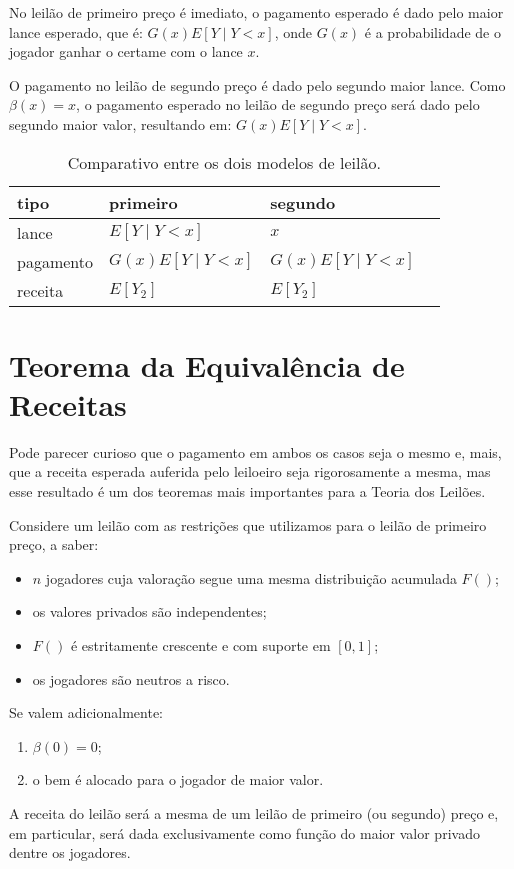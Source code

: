No leilão de primeiro preço é imediato, o pagamento esperado é dado pelo maior lance esperado, que é: $G(x)E\left[ Y \mid Y<x \right]$, onde $G(x)$ é a probabilidade de o jogador ganhar o certame com o lance $x$.

O pagamento no leilão de segundo preço é dado pelo segundo maior lance. Como $\beta(x) = x$, o pagamento esperado no leilão de segundo preço será dado pelo segundo maior valor, resultando em: $G(x)E\left[ Y \mid Y<x \right]$.

\begin{table}[]
	\centering
	\begin{tabular}{@{}llll@{}}
		\toprule
		tipo      & primeiro 					     & segundo      					\\ \midrule
		lance     & $E\left[ Y \mid Y<x \right]$     & $x$             					\\
		pagamento & $G(x)E\left[ Y \mid Y<x \right]$ & $G(x)E\left[ Y \mid Y<x \right]$ \\
		receita   & $E\left[ Y_2 \right]$            & $E\left[ Y_2 \right]$            \\
	\end{tabular}
	\caption{Comparativo entre os dois modelos de leilão.}
	\label{tab:tabela1}
\end{table}

\section{Teorema da Equivalência de Receitas}

Pode parecer curioso que o pagamento em ambos os casos seja o mesmo e, mais, que a receita esperada auferida pelo leiloeiro seja rigorosamente a mesma, mas esse resultado é um dos teoremas mais importantes para a Teoria dos Leilões.

\begin{teorema}
	\label{teorema:equivalencia_de_receitas}
	Considere um leilão com as restrições que utilizamos para o leilão de primeiro preço, a saber:
	\begin{itemize}
		\item $n$ jogadores cuja valoração segue uma mesma distribuição acumulada $F()$;
		\item os valores privados são independentes;
		\item $F()$ é estritamente crescente e com suporte em $[0,1]$;
		\item os jogadores são neutros a risco.
	\end{itemize}
	Se valem adicionalmente:
	\begin{enumerate}
		\item $\beta(0) = 0$;
		\item o bem é alocado para o jogador de maior valor.
	\end{enumerate}
	A receita do leilão será a mesma de um leilão de primeiro (ou segundo) preço e, em particular, será dada exclusivamente como função do maior valor privado dentre os jogadores.
\end{teorema}

